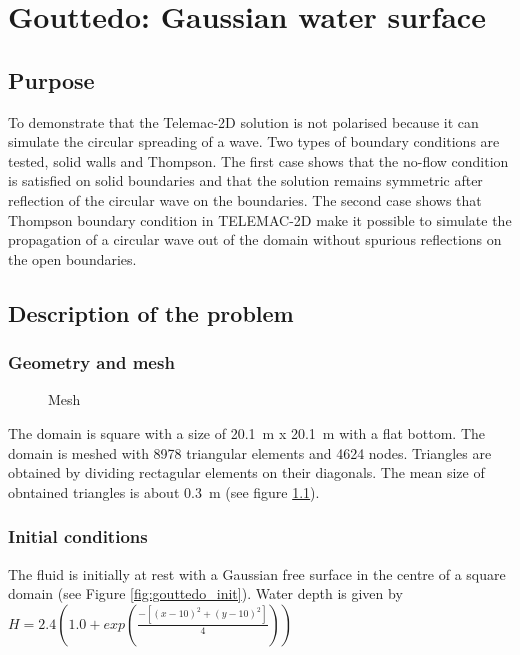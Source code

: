 
\chapter{Gouttedo: Gaussian water surface}
%
%
\section{Purpose}
%
To demonstrate that the Telemac-2D solution is not polarised because it can
simulate the circular spreading of a wave. 
Two types of boundary conditions are tested, solid walls and Thompson.
The first case shows that the no-flow
condition is satisfied on solid boundaries and that the solution remains
symmetric after reflection of the circular wave on the boundaries.
The second case shows that Thompson boundary condition in TELEMAC-2D 
make it possible to simulate the propagation of a circular wave out of the domain 
without spurious reflections on the open boundaries.

%
\section{Description of the problem}
%
\subsection{Geometry and mesh}

\begin{figure}[h]
\begin{center}
\end{center}
\caption{Mesh}
\label{fig:gouttedo_mesh}
\end{figure}

The domain is square with a size of  20.1~m x 20.1~m with a flat bottom.
The domain is meshed with 8978 triangular elements and 4624 nodes. Triangles
are obtained by dividing rectagular elements on their diagonals. The mean size
of obntained triangles is about 0.3~m (see figure \ref{fig:gouttedo_mesh}).

\subsection{Initial conditions}
The fluid is initially at rest with a Gaussian free surface in the centre of a
square domain (see Figure \ref{fig:gouttedo_init}). Water depth is given by
$ H= 2.4 \left(1.0+exp \left( \frac{-\left[ (x-10)^2+( y-10)^2\right]}{ 4}\right)\right) $

